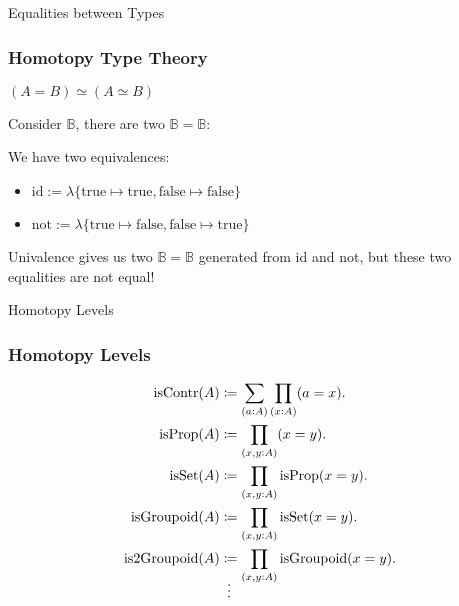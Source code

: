 \documentclass[9pt]{beamer}
\begin{document}
\begin{frame}{Equalities between Types}
\frametitle{Homotopy Type Theory}

\begin{tblock}
  $(A = B) \simeq (A \simeq B)$
\end{tblock}

Consider $\mathbb{B}$, there are \alert{two} $\mathbb{B} = \mathbb{B}$:

We have two equivalences:
\begin{itemize}
    \item $\text{id} := \lambda \{ \text{true} \mapsto \text{true}, \text{false} \mapsto \text{false} \}$
    \item $\text{not} := \lambda \{ \text{true} \mapsto \text{false}, \text{false} \mapsto \text{true} \}$
\end{itemize}

Univalence gives us two $\mathbb{B} = \mathbb{B}$ generated from \alert{id} and \alert{not},
but these two equalities are not equal!

\end{frame}

\begin{frame}{Homotopy Levels}
\frametitle{Homotopy Levels}

\begin{align*}
  \text{isContr}(A) & \coloneqq \sum_{(a:A)} \prod_{(x:A)} (a = x).
  \\
  \text{isProp}(A) & \coloneqq \prod_{(x,y:A)} (x = y).
  \\
  \text{isSet}(A) & \coloneqq \prod_{(x,y:A)} \text{isProp}(x = y).
  \\
  \text{isGroupoid}(A) & \coloneqq \prod_{(x,y:A)} \text{isSet}(x = y).
  \\
  \text{is2Groupoid}(A) & \coloneqq \prod_{(x,y:A)} \text{isGroupoid}(x = y).
  \\
  \shortvdotswithin{=}
\end{align*}

\end{frame}
\end{document}
